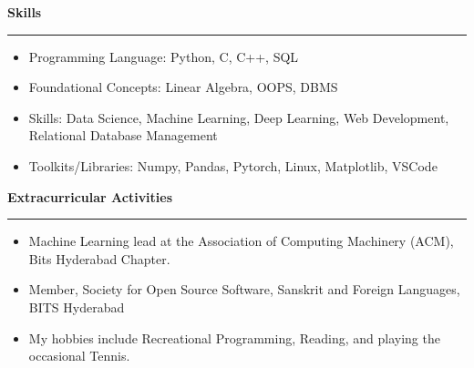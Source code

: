 \documentclass[a4paper,12pt]{report}
\begin{document}
 \par
\vspace{9pt}


\noindent 
\textbf{Skills} \par
\vspace{2pt}
\hrule
\vspace{6pt}
\noindent 
\begin{itemize}[noitemsep,topsep=0pt]
\item {\fontsize{12pt}{12pt}\selectfont Programming Language:}  Python, C, C++, SQL \par
\noindent 
\item {\fontsize{12pt}{12pt}\selectfont Foundational Concepts:} Linear Algebra, OOPS, DBMS \par
\noindent 
\item {\fontsize{12pt}{12pt}\selectfont Skills:} Data Science, Machine Learning, Deep Learning, Web Development, Relational Database Management \par
\noindent 
\item {\fontsize{12pt}{12pt}\selectfont Toolkits/Libraries:} Numpy, Pandas, Pytorch, Linux, Matplotlib, VSCode \par
\end{itemize}

\noindent
\textbf{Extracurricular Activities} \par
\vspace{2pt}
\hrule
\vspace{6pt}
\begin{itemize}[left=0pt, noitemsep, topsep=0pt]
    \item {\fontsize{12pt}{12pt} Machine Learning lead at the Association of Computing Machinery (ACM), Bits Hyderabad Chapter.}
    \item {\fontsize{12pt}{12pt}\selectfont Member, Society for Open Source Software, Sanskrit and Foreign Languages, BITS Hyderabad} \par
    \item {\fontsize{12pt}{12pt}\selectfont My hobbies include Recreational Programming, Reading, and playing the occasional Tennis.} \par
\end{itemize}
\end{document}
